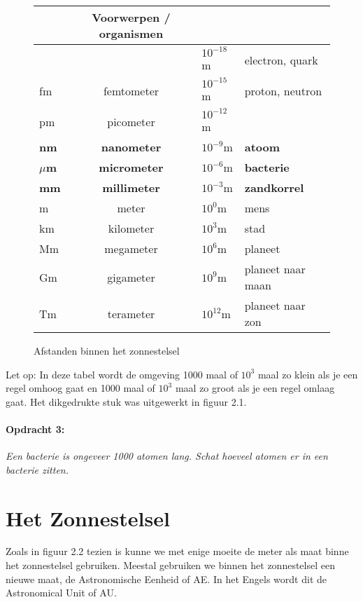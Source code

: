 \begin{figure}[h]
\noindent \begin{centering}
\begin{tabular}{|>{\centering}p{1.5cm}|c|>{\centering}p{2cm}|>{\centering}p{7.5cm}|}
\hline 
\multicolumn{3}{|>{\centering}p{7.5cm}|}{Eenheid} & Voorwerpen / organismen\tabularnewline
\hline 
\hline 
 &  & $10^{-18}$m & electron, quark\tabularnewline
\hline 
fm & femtometer & $10^{-15}$m & proton, neutron\tabularnewline
\hline 
pm & picometer & $10^{-12}$m & \tabularnewline
\hline 
\textbf{nm} & \textbf{nanometer} & \textbf{$10^{-9}$}m & \textbf{atoom}\tabularnewline
\hline 
\textbf{$\mu$m} & \textbf{micrometer} & \textbf{$10^{-6}$}m & \textbf{bacterie}\tabularnewline
\hline 
\textbf{mm} & \textbf{millimeter} & \textbf{$10^{-3}$}m & \textbf{zandkorrel}\tabularnewline
\hline 
m & meter & $10^{0}$m & mens\tabularnewline
\hline 
km & kilometer & $10^{3}$m & stad\tabularnewline
\hline 
Mm & megameter & $10^{6}$m & planeet\tabularnewline
\hline 
Gm & gigameter & $10^{9}$m & planeet naar maan\tabularnewline
\hline 
Tm & terameter & $10^{12}$m & planeet naar zon\tabularnewline
\hline 
\end{tabular}
\par\end{centering}

\caption{Afstanden binnen het zonnestelsel}
\end{figure}


Let op: In deze tabel wordt de omgeving 1000 maal of $10^{3}$ maal
zo klein als je een regel omhoog gaat en 1000 maal of $10^{3}$ maal
zo groot als je een regel omlaag gaat. Het dikgedrukte stuk was uitgewerkt
in figuur 2.1.


\paragraph*{Opdracht 3:}

\emph{Een bacterie is ongeveer 1000 atomen lang. Schat hoeveel atomen
er in een bacterie zitten.}


\section{Het Zonnestelsel}

Zoals in figuur 2.2 tezien is kunne we met enige moeite de meter als
maat binne het zonnestelsel gebruiken. Meestal gebruiken we binnen
het zonnestelsel een nieuwe maat, de Astronomische Eenheid of AE.
In het Engels wordt dit de Astronomical Unit of AU.

